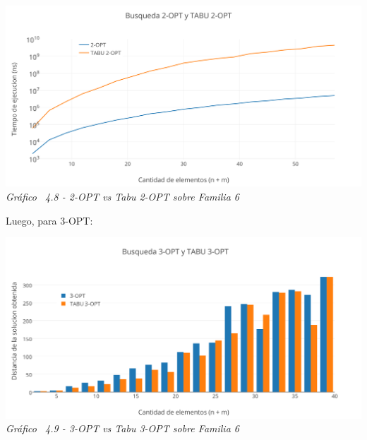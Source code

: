 \vspace*{0.3cm} \vspace*{0.3cm}
  \begin{center}
 \includegraphics[scale=0.5]{./EJ4/medicion2optsinorden.png}\\
 {            \textit{Gráfico \ 4.8 - 2-OPT vs Tabu 2-OPT sobre Familia 6}}
  \end{center}
  \vspace*{0.3cm}

Luego, para 3-OPT:

\vspace*{0.3cm} \vspace*{0.3cm}
  \begin{center}
 \includegraphics[scale=0.5]{./EJ4/comparativogym03opt.png}\\
 {            \textit{Gráfico \ 4.9 - 3-OPT vs Tabu 3-OPT sobre Familia 6}}
  \end{center}
  \vspace*{0.3cm}

